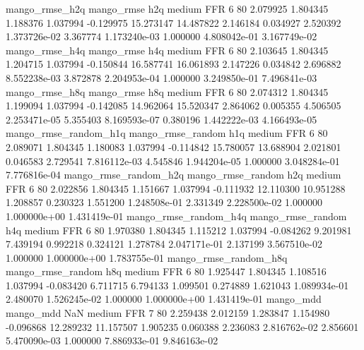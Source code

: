        mango_rmse_h2q        mango_rmse                  h2q     medium      FFR                 6 80  2.079925       1.804345 1.188376       1.037994   -0.129975     15.273147     14.487822     2.146184       0.034927  2.520392 1.373726e-02     3.367774   1.173240e-03            1.000000    4.808042e-01        3.167749e-02
       mango_rmse_h4q        mango_rmse                  h4q     medium      FFR                 6 80  2.103645       1.804345 1.204715       1.037994   -0.150844     16.587741     16.061893     2.147226       0.034842  2.696882 8.552238e-03     3.872878   2.204953e-04            1.000000    3.249850e-01        7.496841e-03
       mango_rmse_h8q        mango_rmse                  h8q     medium      FFR                 6 80  2.074312       1.804345 1.199094       1.037994   -0.142085     14.962064     15.520347     2.864062       0.005355  4.506505 2.253471e-05     5.355403   8.169593e-07            0.380196    1.442222e-03        4.166493e-05
mango_rmse_random_h1q mango_rmse_random                  h1q     medium      FFR                 6 80  2.089071       1.804345 1.180083       1.037994   -0.114842     15.780057     13.688904     2.021801       0.046583  2.729541 7.816112e-03     4.545846   1.944204e-05            1.000000    3.048284e-01        7.776816e-04
mango_rmse_random_h2q mango_rmse_random                  h2q     medium      FFR                 6 80  2.022856       1.804345 1.151667       1.037994   -0.111932     12.110300     10.951288     1.208857       0.230323  1.551200 1.248508e-01     2.331349   2.228500e-02            1.000000    1.000000e+00        1.431419e-01
mango_rmse_random_h4q mango_rmse_random                  h4q     medium      FFR                 6 80  1.970380       1.804345 1.115212       1.037994   -0.084262      9.201981      7.439194     0.992218       0.324121  1.278784 2.047171e-01     2.137199   3.567510e-02            1.000000    1.000000e+00        1.783755e-01
mango_rmse_random_h8q mango_rmse_random                  h8q     medium      FFR                 6 80  1.925447       1.804345 1.108516       1.037994   -0.083420      6.711715      6.794133     1.099501       0.274889  1.621043 1.089934e-01     2.480070   1.526245e-02            1.000000    1.000000e+00        1.431419e-01
            mango_mdd         mango_mdd                  NaN     medium      FFR                 7 80  2.259438       2.012159 1.283847       1.154980   -0.096868     12.289232     11.157507     1.905235       0.060388  2.236083 2.816762e-02     2.856601   5.470090e-03            1.000000    7.886933e-01        9.846163e-02
